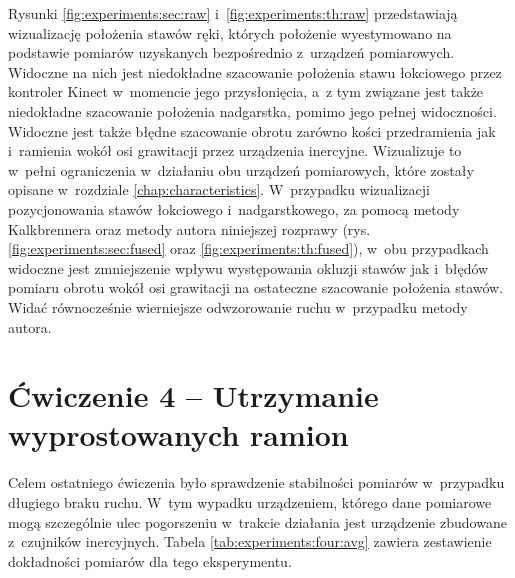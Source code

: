 Rysunki \ref{fig:experiments:sec:raw} i~\ref{fig:experiments:th:raw} przedstawiają wizualizację położenia stawów ręki, których położenie wyestymowano na podstawie pomiarów uzyskanych bezpośrednio z~urządzeń pomiarowych. Widoczne na nich jest niedokładne szacowanie położenia stawu łokciowego przez kontroler Kinect w~momencie jego przysłonięcia, a~z tym związane jest także niedokładne szacowanie położenia nadgarstka, pomimo jego pełnej widoczności. Widoczne jest także błędne szacowanie obrotu zarówno kości przedramienia jak i~ramienia wokół osi grawitacji przez urządzenia inercyjne. Wizualizuje to w~pełni ograniczenia w~działaniu obu urządzeń pomiarowych, które zostały opisane w~rozdziale \ref{chap:characteristics}. W~przypadku wizualizacji pozycjonowania stawów łokciowego i~nadgarstkowego, za pomocą metody Kalkbrennera oraz metody autora niniejszej rozprawy (rys. \ref{fig:experiments:sec:fused} oraz \ref{fig:experiments:th:fused}), w~obu przypadkach widoczne jest zmniejszenie wpływu występowania okluzji stawów jak i~błędów pomiaru obrotu wokół osi grawitacji na ostateczne szacowanie położenia stawów. Widać równocześnie wierniejsze odwzorowanie ruchu w~przypadku metody autora.\\

\section*{Ćwiczenie 4 -- Utrzymanie wyprostowanych ramion}
Celem ostatniego ćwiczenia było sprawdzenie stabilności pomiarów w~przypadku długiego braku ruchu. W~tym wypadku urządzeniem, którego dane pomiarowe mogą szczególnie ulec pogorszeniu w~trakcie działania jest urządzenie zbudowane z~czujników inercyjnych. Tabela \ref{tab:experiments:four:avg} zawiera zestawienie dokładności pomiarów dla tego eksperymentu.

